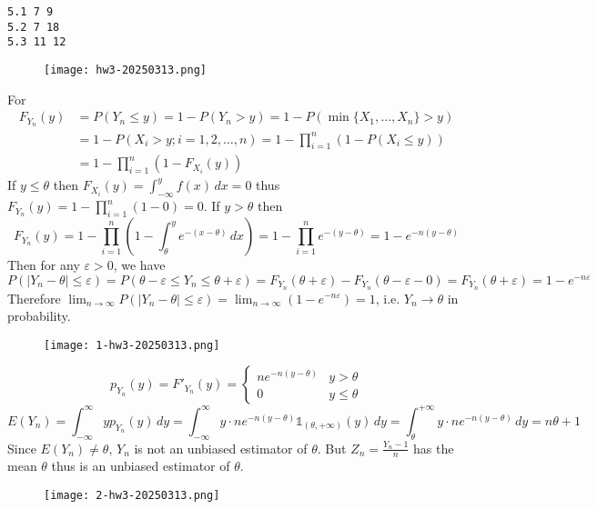 \begin{lstlisting}
5.1 7 9
5.2 7 18
5.3 11 12
\end{lstlisting}
\begin{figure}[H]
\centering
\texttt{[image: hw3-20250313.png]}
\label{}
\end{figure}

For
\[
\begin{aligned}
F_{Y_n}(y) & =P(Y_n\leq y)=1-P(Y_n>y)=1-P(\min\{ X_1,\dots,X_n \}>y) \\
 & =1-P(X_i>y;i=1,2,\dots,n)=1-\prod_{i=1}^{n} (1-P(X_i\leq y)) \\
 & =1-\prod_{i=1}^{n} (1-F_{X_i}(y))
\end{aligned}
\]
If $y\leq\theta$ then $F_{X_i}(y)=\int_{-\infty}^{y} f(x) \, dx=0$ thus $F_{Y_n}(y)=1-\prod_{i=1}^{n}(1-0)=0$.
If $y>\theta$ then
\[
F_{Y_n}(y)=1-\prod_{i=1}^{n} \left( 1-\int_{\theta}^{y} e^{ -(x-\theta) } \, dx  \right)=1-\prod_{i=1}^{n} e^{ -(y-\theta) }=1-e^{ -n(y-\theta) }
\]
Then for any $\varepsilon>0$, we have
\[
P(\lvert Y_n-\theta \rvert \leq \varepsilon)=P(\theta-\varepsilon \leq Y_n\leq \theta+\varepsilon)=F_{Y_n}(\theta+\varepsilon)-F_{Y_n}(\theta-\varepsilon-0)=F_{Y_n}(\theta+\varepsilon)=1-e^{ -n\varepsilon }
\]
Therefore $\lim_{ n \to \infty }P(\lvert Y_n-\theta \rvert \leq\varepsilon)=\lim_{ n \to \infty }(1-e^{ -n\varepsilon })=1$, i.e. $Y_n\to\theta$ in probability.

\begin{figure}[H]
\centering
\texttt{[image: 1-hw3-20250313.png]}
\label{}
\end{figure}
\[
p_{Y_n}(y)=F'_{Y_n}(y)=\begin{cases}
ne^{ -n(y-\theta) } & y>\theta \\
0 & y\leq \theta
\end{cases}
\]
\[
E(Y_n)=\int_{-\infty}^{\infty} yp_{Y_n}(y) \, dy =\int_{-\infty}^{\infty} y\cdot ne^{ -n(y-\theta) }\mathbb{1_{(\theta,+\infty)}}(y)  \, dy=\int_{\theta}^{+\infty } y\cdot ne^{ -n(y-\theta) } \, dy =n\theta+1
\]
Since $E(Y_n)\neq\theta$, $Y_n$ is not an unbiased estimator of $\theta$. But $Z_n=\frac{Y_n-1}{n}$ has the mean $\theta$ thus is an unbiased estimator of $\theta$.

\begin{figure}[H]
\centering
\texttt{[image: 2-hw3-20250313.png]}
\label{}
\end{figure}

